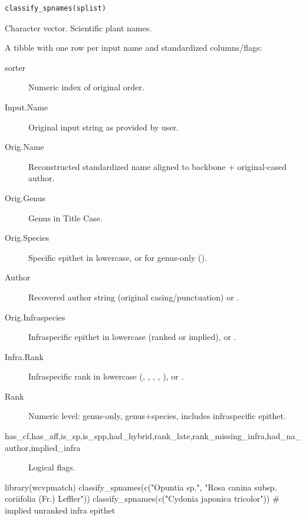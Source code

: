 \documentclass[a4paper]{book}
\begin{document}
%
\begin{Usage}
\begin{verbatim}
classify_spnames(splist)
\end{verbatim}
\end{Usage}
%
\begin{Arguments}
\begin{ldescription}
\item[\code{splist}] Character vector. Scientific plant names.
\end{ldescription}
\end{Arguments}
%
\begin{Value}
A tibble with one row per input name and standardized columns/flags:
\begin{description}

\item[sorter] Numeric index of original order.
\item[Input.Name] Original input string as provided by user.
\item[Orig.Name] Reconstructed standardized name aligned to backbone + original-cased author.
\item[Orig.Genus] Genus in Title Case.
\item[Orig.Species] Specific epithet in lowercase, or  for genus-only ().
\item[Author] Recovered author string (original casing/punctuation) or .
\item[Orig.Infraspecies] Infraspecific epithet in lowercase (ranked or implied), or .
\item[Infra.Rank] Infraspecific rank in lowercase (, , , , ), or .
\item[Rank] Numeric level:  genus-only,  genus+species,  includes infraspecific epithet.
\item[has\_cf,has\_aff,is\_sp,is\_spp,had\_hybrid,rank\_late,rank\_missing\_infra,had\_na\_author,implied\_infra] Logical flags.

\end{description}

\end{Value}
%
\begin{Examples}
\begin{ExampleCode}
library(wcvpmatch)
classify_spnames(c("Opuntia sp.", "Rosa canina subsp. coriifolia (Fr.) Leffler"))
classify_spnames(c("Cydonia japonica tricolor")) # implied unranked infra epithet
\end{ExampleCode}
\end{Examples}
\end{document}
